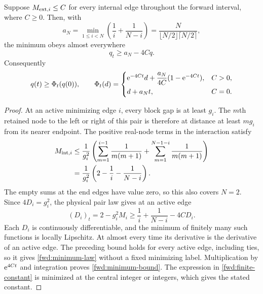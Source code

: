 \begin{theorem}
\label{fwd:minimum-transport}
Suppose $M_{{\rm ext},i}\le C$ for every internal edge throughout the
forward interval, where $C\ge0$. Then, with
\begin{equation}
 a_N=\min_{1\le i<N}\left(\frac1i+\frac1{N-i}\right)
     =\frac{N}{\lfloor N/2\rfloor\lceil N/2\rceil},
 \label{fwd:finite-constant}
\end{equation}
the minimum obeys almost everywhere
\begin{equation}
 q_t\ge a_N-4Cq.
 \label{fwd:minimum-law}
\end{equation}
Consequently
\begin{equation}
 q(t)\ge\Phi_t(q(0)),\qquad
 \Phi_t(d)=
 \begin{cases}
 \mathrm e^{-4Ct}d+\dfrac{a_N}{4C}(1-\mathrm e^{-4Ct}),&C>0,\\[5pt]
 d+a_Nt,&C=0.
 \end{cases}
 \label{fwd:minimum-bound}
\end{equation}
\end{theorem}
\begin{proof}
At an active minimizing edge $i$, every block gap is at least $g_i$.
The $m$th retained node to the left or right of this pair is therefore
at distance at least $mg_i$ from its nearer endpoint. The positive
real-node terms in the interaction satisfy
\begin{align}
 M_{{\rm int},i}
 &\le\frac1{g_i^2}\left(
       \sum_{m=1}^{i-1}\frac1{m(m+1)}
       +\sum_{m=1}^{N-1-i}\frac1{m(m+1)}\right)\notag\\
 &=\frac1{g_i^2}\left(2-\frac1i-\frac1{N-i}\right).
 \label{fwd:internal-bound}
\end{align}
The empty sums at the end edges have value zero, so this also covers
$N=2$. Since $4D_i=g_i^2$, the physical pair law gives at an active edge
\[
 (D_i)_t=2-g_i^2M_i
 \ge\frac1i+\frac1{N-i}-4CD_i.
\]
Each $D_i$ is continuously differentiable, and the minimum of finitely
many such functions is locally Lipschitz. At almost every time its
derivative is the derivative of an active edge. The preceding bound
holds for every active edge, including ties, so it gives
\eqref{fwd:minimum-law} without a fixed minimizing label. Multiplication
by $\mathrm e^{4Ct}$ and integration proves \eqref{fwd:minimum-bound}.
The expression in \eqref{fwd:finite-constant} is minimized at the central
integer or integers, which gives the stated constant.
\end{proof}

